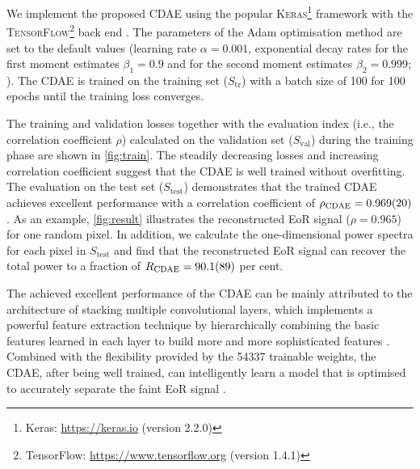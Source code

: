 \documentclass[letters,fleqn,usenatbib]{mnras}
\newcommand{\R}[1]{\mathrm{#1}}
\begin{document}
We implement the proposed CDAE using the popular \textsc{Keras}\footnote{%
  Keras: \url{https://keras.io} (version 2.2.0)}
framework \citep{keras} with the \textsc{TensorFlow}\footnote{%
TensorFlow: \url{https://www.tensorflow.org} (version 1.4.1)}
back end \citep{tensorflow}.
The parameters of the Adam optimisation method are set to the default
values (learning rate $\alpha = 0.001$, exponential decay rates for the
first moment estimates $\beta_1 = 0.9$ and for the second moment
estimates $\beta_2 = 0.999$; \citealt{kingma2015}).
The CDAE is trained on the training set ($S_{\R{tr}}$) with a batch size
of 100 for 100 epochs until the training loss converges.

The training and validation losses together with the evaluation index
(i.e., the correlation coefficient $\rho$) calculated on the validation set
($S_{\R{val}}$) during the training phase are shown in \autoref{fig:train}.
The steadily decreasing losses and increasing correlation coefficient
suggest that the CDAE is well trained without overfitting.
The evaluation on the test set ($S_{\R{test}}$) demonstrates that the
trained CDAE achieves excellent performance with a correlation
coefficient of $\rho_{\R{CDAE}} = \num{0.969 +- 0.020}$.
As an example, \autoref{fig:result} illustrates the reconstructed EoR
signal ($\rho = 0.965$) for one random pixel.
In addition, we calculate the one-dimensional power spectra for each
pixel in $S_{\R{test}}$ \citep[e.g.,][]{chapman2013}
and find that the reconstructed EoR signal can recover the total power
to a fraction of $R_{\R{CDAE}} = \num{90.1 +- 8.9}$ per cent.

The achieved excellent performance of the CDAE can be mainly attributed
to the architecture of stacking multiple convolutional layers, which
implements a powerful feature extraction technique by hierarchically
combining the basic features learned in each layer to build more and
more sophisticated features \citep{lecun2015}.
Combined with the flexibility provided by the \num{54337} trainable
weights, the CDAE, after being well trained, can intelligently learn a
model that is optimised to accurately separate the faint EoR signal
\citep[e.g.,][]{domingos2012}.
\end{document}
